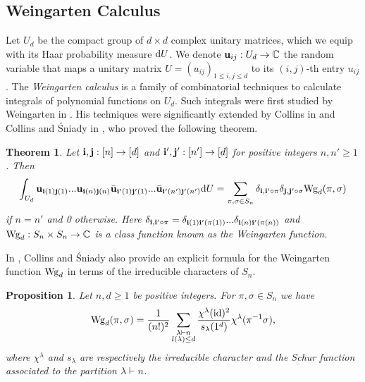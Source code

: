 \documentclass[11pt, a4paper, oneside, reqno]{amsart}
\newtheorem*{proposition*}{Proposition}
\newtheorem*{theorem*}{Theorem}
\theoremstyle{remark}
\theoremstyle{definition}
\numberwithin{equation}{section}
\begin{document}
\subsection{Weingarten Calculus}
\label{sec:WeinCalc}
Let $U_d$ be the compact group of $d \times d$ complex unitary matrices, which we equip with its  Haar probability measure ${\rm d}U$. We denote ${\bf u}_{ij}: U_d \to \mathbb{C}$ the random variable that maps a unitary matrix $U = (u_{ij})_{1 \leq i,j \leq d}$ to its $(i,j)$-th entry $u_{ij}$.
The {\it Weingarten calculus} is a family of combinatorial techniques to calculate integrals of polynomial functions on $U_d$. Such integrals were first studied by Weingarten in \cite{weingarten1978asymptotic}. His techniques were significantly extended by Collins in \cite{collins2003moments} and Collins and {\'S}niady in \cite{collins2006integration}, who proved the following theorem.
\begin{theorem*}\cite[Corollary 2.4]{collins2006integration}
	Let ${\bf i},{\bf j}:[n]\to [d]$ and ${\bf i'},    {\bf j'}:[n'] \to [d]$ for positive integers $n,n' \geq 1$. Then
	$$
		\int_{U_d} {\bf u}_{{\bf i}(1){\bf j}(1)}...{\bf u}_{{\bf i}(n){\bf j}(n)} \bar{{\bf u}}_{{\bf i'}(1){\bf j'}(1)}...\bar{{\bf u}}_{{\bf i'}(n'){\bf j'}(n')} {\rm d}U = \sum_{\pi, \sigma \in S_n} \delta_{{\bf i},{\bf i'\circ \pi}}\delta_{{\bf j},{\bf j'\circ \sigma}} {\rm Wg}_d(\pi, \sigma)
	$$
	if $n = n'$ and 0 otherwise.
	\newline Here $\delta_{{\bf i},{\bf i'\circ \pi}} = \delta_{{\bf i}(1){\bf i'}(\pi(1))}...\delta_{{\bf i}(n){\bf i'}(\pi(n))}$ and ${\rm Wg}_d: S_n \times S_n  \to \mathbb{C}$ is a class function known as the {\rm Weingarten function}.
\end{theorem*}
In \cite{collins2006integration}, Collins and {\'S}niady also provide an explicit formula for the Weingarten function ${\rm Wg}_d$ in terms of the irreducible  characters of $S_n$.
\begin{proposition*}\cite[Proposition 2.3, point 2]{collins2006integration}
	Let $n,d \geq 1$ be positive integers. For $\pi, \sigma \in S_n$ we have
	$$
		{\rm Wg}_d(\pi,\sigma) = \frac{1}{(n!)^2}\sum_{\substack{\lambda \vdash n\\ l(\lambda) \leq d}} \frac{\chi^{\lambda}({\rm id})^2}{s_\lambda (1^d)} \chi^{\lambda}(\pi ^{-1}\sigma),
	$$
	where $\chi^{\lambda}$ and $s_\lambda$ are respectively  the irreducible character and the Schur function associated to the partition $\lambda \vdash n$.
\end{proposition*}
\end{document}

